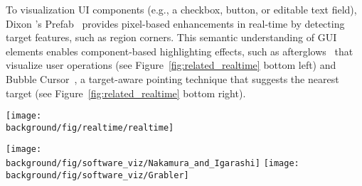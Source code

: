 To visualization UI components (e.g., a checkbox, button, or editable text field), Dixon \ea{}'s Prefab~\cite{Dixon:2010fb,Dixon:2011:CHP:1978942.1979086} provides pixel-based enhancements in real-time by detecting target features, such as region corners. This semantic understanding of GUI elements enables component-based highlighting effects, such as afterglows~\cite{Baudisch:2006:PET:1166253.1166280} that visualize user operations (see Figure~\ref{fig:related_realtime} bottom left) and Bubble Cursor~\cite{Grossman:2005:BCE:1054972.1055012}, a target-aware pointing technique that suggests the nearest target (see Figure~\ref{fig:related_realtime} bottom right).

\begin{figure*}[t!]
  \centering
  \texttt{[image: \\background/fig/realtime/realtime]}
  \caption{Real-time visual enhancements on GUI applications: The top row shows how Mouseposé highlights a mouse cursor (left) and keyboard input (right); The bottom row presents Prefab~\cite{Dixon:2010fb}'s results of reverse engineering that identifies UI components and enables visualizations during author operations, such as afterglow~\cite{Baudisch:2006:PET:1166253.1166280} (left) and target-aware~\cite{Grossman:2005:BCE:1054972.1055012} (right) effects.}
  \label{fig:related_realtime}
\end{figure*}

\begin{figure*}[t!]
  \centering
  \texttt{[image: \\background/fig/software\_viz/Nakamura\_and\_Igarashi]}
  \texttt{[image: \\background/fig/software\_viz/Grabler]}
  \caption{Example screenshots where mouse operations are automatically rendered, including (top) mouse move, drag, click, and wheel (a-d) by Nakamura and Igarashi~\cite{Nakamura:2008:ASV:1449715.1449721} and (bottom) application-specific operations (a-b), parameters (c-f), and manipulations (g-h) by Grabler \ea{}~\cite{Grabler:2009jj}.}
  \label{fig:related_events}
\end{figure*}

